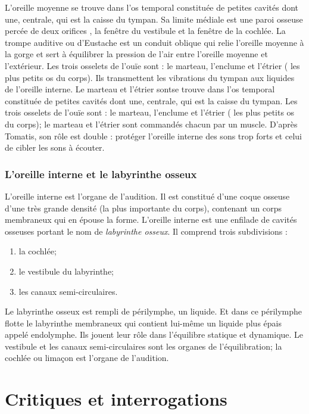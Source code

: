 L'oreille moyenne se trouve dans l'os temporal constituée de petites
cavités dont une, centrale, qui est la caisse du tympan. Sa limite
médiale est une paroi osseuse percée de deux orifices , la fenêtre
du vestibule et la fenêtre de la cochlée. La trompe auditive ou d'Eustache
est un conduit oblique qui relie l'oreille moyenne à la gorge et sert
à équilibrer la pression de l'air entre l'oreille moyenne et l'extérieur.
Les trois osselets de l'ouïe sont : le marteau, l'enclume et l'étrier
( les plus petits os du corps). Ils transmettent les vibrations du
tympan aux liquides de l'oreille interne. Le marteau et l'étrier sontse
trouve dans l'os temporal constituée de petites cavités dont une,
centrale, qui est la caisse du tympan. Les trois osselets de l'ouïe
sont : le marteau, l'enclume et l'étrier ( les plus petits os du corps);
le marteau et l'étrier sont commandés chacun par un muscle. D'après
Tomatis, son rôle est double : protéger l'oreille interne des sons
trop forts et celui de cibler les sons à écouter.

\subsubsection{L'oreille interne et le labyrinthe osseux}

L'oreille interne est l'organe de l'audition. Il
est constitué d'une coque osseuse d'une très grande densité (la plus
importante du corps), contenant un corps membraneux qui en épouse
la forme. 
L'oreille interne est une enfilade de cavités osseuses portant 
le nom de \emph{labyrinthe osseux}. Il comprend trois subdivisions : 
\begin{enumerate}
	\item la cochlée;
	\item le vestibule du labyrinthe;
	\item  les canaux semi-circulaires.
\end{enumerate}

Le labyrinthe
osseux est rempli de périlymphe, un liquide. Et dans ce périlymphe
flotte le labyrinthe membraneux qui contient lui-même un liquide
plus épais appelé endolymphe. Ils jouent leur rôle dans l'équilibre
statique et dynamique. Le vestibule et les canaux semi-circulaires
sont les organes de l'équilibration; la cochlée ou
limaçon est l'organe de l'audition. 



\section{Critiques et interrogations}

